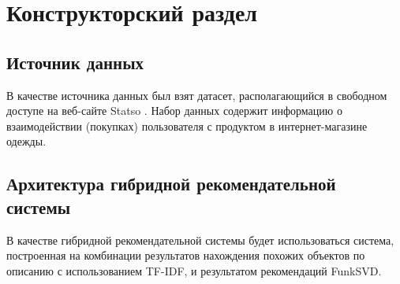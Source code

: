 \section{Конструкторский раздел}

\subsection{Источник данных}

В качестве источника данных был взят датасет, располагающийся в свободном доступе на веб-сайте  Statso \cite{dataset}. Набор данных содержит информацию о взаимодействии (покупках) пользователя с продуктом в интернет-магазине одежды.

\subsection{Архитектура гибридной рекомендательной системы}

В качестве гибридной рекомендательной системы будет использоваться система, построенная на комбинации результатов нахождения похожих объектов по описанию с использованием TF-IDF, и результатом рекомендаций FunkSVD.

\pagebreak